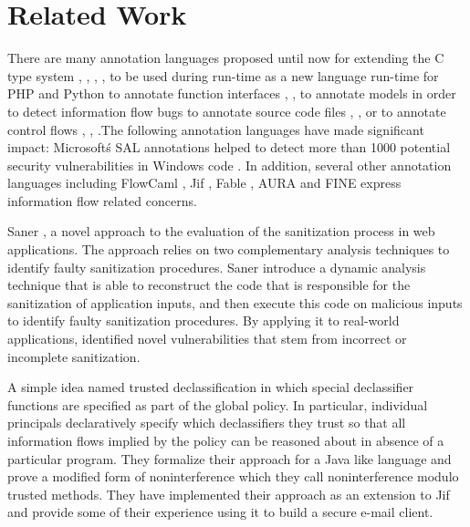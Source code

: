 \chapter{Related Work}

There are many annotation languages proposed until now for
extending the C type system \cite{ref_54_condit:dependent}, \cite{ref_53_evans:static}, \cite{ref_51_microsoft:sal}, \cite{ref_55_sun:lock}, \cite{ref_56_torvalds:sparse} to be
used during run-time as a new language run-time for PHP and
Python \cite{ref_57_alex:improving} to annotate function interfaces \cite{ref_53_evans:static}, \cite{ref_51_microsoft:sal}, \cite{ref_56_torvalds:sparse} to
annotate models in order to detect information flow bugs \cite{ref_58_iflow:kuzman}
to annotate source code files \cite{ref_59_rosenblum:towards}, \cite{ref_60_rosenblum:practical}, \cite{ref_61_lintan:acomment} or to annotate
control flows \cite{ref_53_evans:static}, \cite{ref_52_splint:flow}, \cite{ref_51_microsoft:sal}.The following annotation languages have made significant impact: Microsoft\'s SAL annotations \cite{ref_51_microsoft:sal} helped to detect more than 1000 potential security vulnerabilities in Windows
code \cite{ref_50_ball:research}. In addition, several other annotation languages including FlowCaml \cite{ref_49_simonet:flowcaml}, Jif \cite{ref_48_chong:jif}, Fable \cite{ref_47_swamy:fable}, AURA \cite{ref_46_jia:aura} and FINE \cite{ref_45_nikhil:fine} express information flow related concerns.

Saner \cite{ref_61_lintan:acomment}, a novel approach to the evaluation of the sanitization process in web applications. The approach relies on two complementary analysis techniques to identify faulty sanitization procedures. Saner \cite{ref_61_lintan:acomment} introduce a dynamic analysis technique that is
able to reconstruct the code that is responsible for
the sanitization of application inputs, and then execute this code on malicious inputs to identify faulty
sanitization procedures. By applying
it to real-world applications, identified novel vulnerabilities that stem from incorrect or incomplete sanitization.

A simple idea named trusted declassification \cite{ref_2_hicks2006trusted} in which special declassifier functions are specified as part of the global policy. In particular, individual principals declaratively specify which declassifiers they trust so that all information flows implied by the policy can be reasoned about in absence of a particular program. They formalize their approach for a Java like language and prove a modified form of noninterference which they call noninterference modulo trusted methods. They have implemented their approach as an extension to Jif and provide some of their experience using it to build a secure e-mail client.

